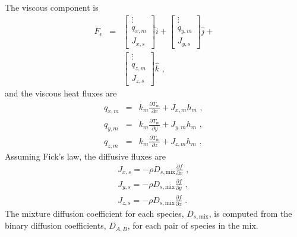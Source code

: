 The viscous component is
\begin{eqnarray}
 \overline{F}_{v} & = & \left [ 
                            \begin{array}{c} 
                                \vdots \\
                                q_{x,m} \\
                                J_{x,s}
                            \end{array}
                          \right ] \hat{i} 
                        + \left [ 
                             \begin{array}{c}
                                 \vdots \\
                                 q_{y,m} \\
                                 J_{y,s}
                             \end{array}
                          \right ] \hat{j}  + \nonumber \\
                  &   &   \left [
                             \begin{array}{c}
                                 \vdots \\
                                 q_{z,m} \\
                                 J_{z,s}
                             \end{array}
                          \right ] \hat{k} \text{ , }
 \label{eq:F_v_ht}
\end{eqnarray}
and the viscous heat fluxes are
\begin{eqnarray}
 q_{x,m} &=& k_m \frac{\partial T_m}{\partial x} + J_{x,m} h_m\text{ , } \nonumber \\
 q_{y,m} &=& k_m \frac{\partial T_m}{\partial y} + J_{y,m} h_m\text{ , } \nonumber \\
 q_{z,m} &=& k_m \frac{\partial T_m}{\partial z} + J_{z,m} h_m\text{ . } \label{eq:qs_ht}
\end{eqnarray}
Assuming Fick's law, the diffusive fluxes are
\begin{eqnarray}
J_{x,s} = -\rho D_{s,\text{mix}} \frac{\partial f}{\partial x}\text{ , }\nonumber \\
J_{y,s} = -\rho D_{s,\text{mix}} \frac{\partial f}{\partial y}\text{ , }\nonumber \\
J_{z,s} = -\rho D_{s,\text{mix}} \frac{\partial f}{\partial z}\text{ . }\label{eq:Js_ht}
\end{eqnarray}
The mixture diffusion coefficient for each species, $D_{s,\text{mix}}$, is computed from the binary diffusion coefficients, $D_{A,B}$, for each pair of species in the mix.
